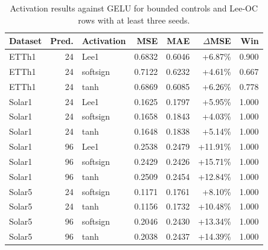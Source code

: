 \begin{table}[t]
\centering
\caption{Activation results against GELU for bounded controls and Lee-OC rows with at least three seeds.}
\label{tab:bounded_vs_gelu}
\begin{tabular}{lrlrrrr}
\toprule
Dataset & Pred. & Activation & MSE & MAE & $\Delta$MSE & Win \\
\midrule
ETTh1 & 24 & Lee1 & 0.6832 & 0.6046 & +6.87\% & 0.900 \\
ETTh1 & 24 & softsign & 0.7122 & 0.6232 & +4.61\% & 0.667 \\
ETTh1 & 24 & tanh & 0.6869 & 0.6085 & +6.26\% & 0.778 \\
Solar1 & 24 & Lee1 & 0.1625 & 0.1797 & +5.95\% & 1.000 \\
Solar1 & 24 & softsign & 0.1658 & 0.1843 & +4.03\% & 1.000 \\
Solar1 & 24 & tanh & 0.1648 & 0.1838 & +5.14\% & 1.000 \\
Solar1 & 96 & Lee1 & 0.2538 & 0.2479 & +11.91\% & 1.000 \\
Solar1 & 96 & softsign & 0.2429 & 0.2426 & +15.71\% & 1.000 \\
Solar1 & 96 & tanh & 0.2509 & 0.2454 & +12.84\% & 1.000 \\
Solar5 & 24 & softsign & 0.1171 & 0.1761 & +8.10\% & 1.000 \\
Solar5 & 24 & tanh & 0.1156 & 0.1732 & +10.48\% & 1.000 \\
Solar5 & 96 & softsign & 0.2046 & 0.2430 & +13.34\% & 1.000 \\
Solar5 & 96 & tanh & 0.2038 & 0.2437 & +14.39\% & 1.000 \\
\bottomrule
\end{tabular}
\end{table}
